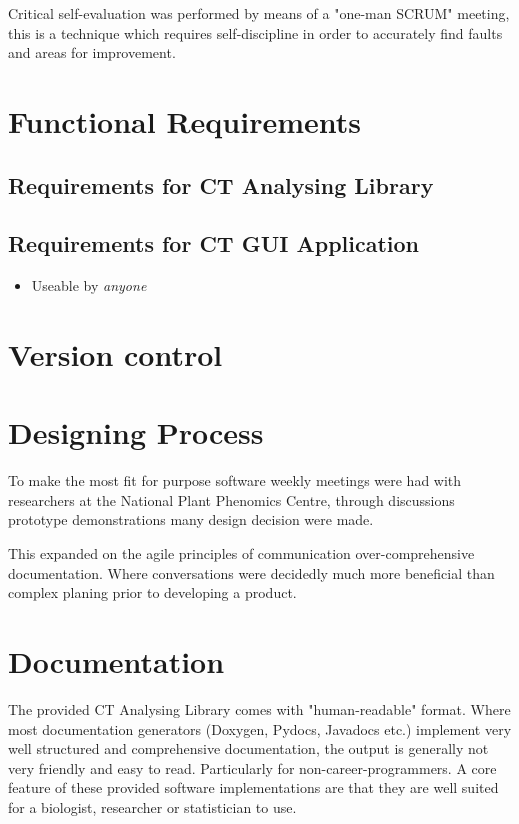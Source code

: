 \documentclass[11pt]{report}
\begin{document}
Critical self-evaluation was performed by means of a "one-man SCRUM" meeting, this is a technique which requires self-discipline in order to accurately find faults and areas for improvement.

\section{Functional Requirements}
\label{sec-2-2}
\subsection{Requirements for CT Analysing Library}
\label{sec-2-2-1}
\subsection{Requirements for CT GUI Application}
\label{sec-2-2-2}
\begin{itemize}
\item Useable by \emph{anyone}
\end{itemize}
\section{Version control}
\label{sec-2-3}
\section{Designing Process}
\label{sec-2-4}
To make the most fit for purpose software weekly meetings were had with researchers at the National Plant Phenomics Centre, through discussions prototype demonstrations many design decision were made.

This expanded on the agile principles of communication over-comprehensive documentation. Where conversations were decidedly much more beneficial than complex planing prior to developing a product.
\section{Documentation}
\label{sec-2-5}
The provided CT Analysing Library comes with "human-readable" format. Where most documentation generators (Doxygen, Pydocs, Javadocs etc.) implement very well structured and comprehensive documentation, the output is generally not very friendly and easy to read. Particularly for non-career-programmers. A core feature of these provided software implementations are that they are well suited for a biologist, researcher or statistician to use.
\end{document}
